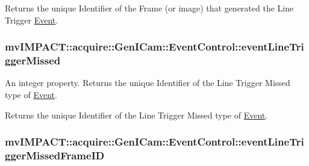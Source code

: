 Returns the unique Identifier of the Frame (or image) that generated the Line Trigger \hyperlink{classmv_i_m_p_a_c_t_1_1acquire_1_1_event}{Event}. \hypertarget{classmv_i_m_p_a_c_t_1_1acquire_1_1_gen_i_cam_1_1_event_control_ad03c012e940d1df99bce895f7643b9a3}{
\subsubsection[{event\+Line\+Trigger\+Missed}]{ mv\+I\+M\+P\+A\+C\+T\+::acquire\+::\+Gen\+I\+Cam\+::\+Event\+Control\+::event\+Line\+Trigger\+Missed}}\label{classmv_i_m_p_a_c_t_1_1acquire_1_1_gen_i_cam_1_1_event_control_ad03c012e940d1df99bce895f7643b9a3}


An integer property. Returns the unique Identifier of the Line Trigger Missed type of \hyperlink{classmv_i_m_p_a_c_t_1_1acquire_1_1_event}{Event}. 

Returns the unique Identifier of the Line Trigger Missed type of \hyperlink{classmv_i_m_p_a_c_t_1_1acquire_1_1_event}{Event}. \hypertarget{classmv_i_m_p_a_c_t_1_1acquire_1_1_gen_i_cam_1_1_event_control_ada6ae3b055ae892261d1a175489ec4b4}{
\subsubsection[{event\+Line\+Trigger\+Missed\+Frame\+I\+D}]{ mv\+I\+M\+P\+A\+C\+T\+::acquire\+::\+Gen\+I\+Cam\+::\+Event\+Control\+::event\+Line\+Trigger\+Missed\+Frame\+I\+D}}\label{classmv_i_m_p_a_c_t_1_1acquire_1_1_gen_i_cam_1_1_event_control_ada6ae3b055ae892261d1a175489ec4b4}


